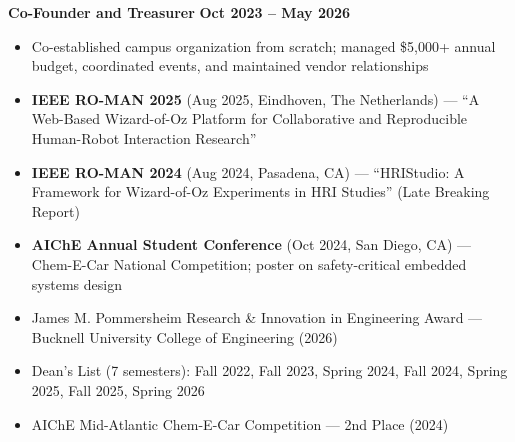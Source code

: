 \documentclass{article}
\begin{document}
 \hfill {}

\textbf{Co-Founder and Treasurer} \hfill \textbf{Oct 2023 – May 2026}
\begin{itemize}[noitemsep,topsep=2pt]
    \item Co-established campus organization from scratch; managed \$5,000+ annual budget, coordinated events, and maintained vendor relationships
\end{itemize}




\begin{itemize}[noitemsep,topsep=2pt]
    \item \textbf{IEEE RO-MAN 2025} (Aug 2025, Eindhoven, The Netherlands) --- ``A Web-Based Wizard-of-Oz Platform for Collaborative and Reproducible Human-Robot Interaction Research''
    \item \textbf{IEEE RO-MAN 2024} (Aug 2024, Pasadena, CA) --- ``HRIStudio: A Framework for Wizard-of-Oz Experiments in HRI Studies'' (Late Breaking Report)
    \item \textbf{AIChE Annual Student Conference} (Oct 2024, San Diego, CA) --- Chem-E-Car National Competition; poster on safety-critical embedded systems design
\end{itemize}


\begin{itemize}[noitemsep,topsep=2pt]
    \item James M. Pommersheim Research \& Innovation in Engineering Award --- Bucknell University College of Engineering (2026)
    \item Dean's List (7 semesters): Fall 2022, Fall 2023, Spring 2024, Fall 2024, Spring 2025, Fall 2025, Spring 2026
    \item AIChE Mid-Atlantic Chem-E-Car Competition --- 2nd Place (2024)
\end{itemize}
\end{document}
